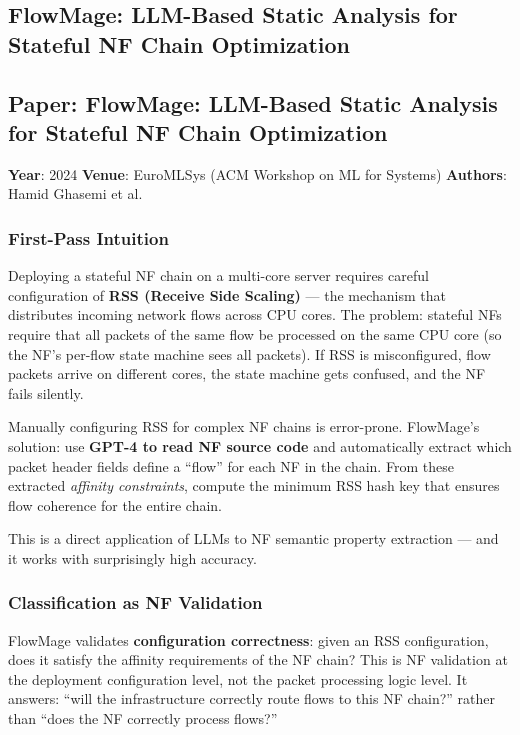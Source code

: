 \subsection{FlowMage: LLM-Based Static Analysis for Stateful NF Chain Optimization}

\subsection*{Paper: FlowMage: LLM-Based Static Analysis for Stateful NF Chain Optimization}
\textbf{Year}: 2024 \quad \textbf{Venue}: EuroMLSys (ACM Workshop on ML for Systems) \quad \textbf{Authors}: Hamid Ghasemi et al.

\subsubsection{First-Pass Intuition}

Deploying a stateful NF chain on a multi-core server requires careful configuration of \textbf{RSS (Receive Side Scaling)} --- the mechanism that distributes incoming network flows across CPU cores. The problem: stateful NFs require that all packets of the same flow be processed on the same CPU core (so the NF's per-flow state machine sees all packets). If RSS is misconfigured, flow packets arrive on different cores, the state machine gets confused, and the NF fails silently.

Manually configuring RSS for complex NF chains is error-prone. FlowMage's solution: use \textbf{GPT-4 to read NF source code} and automatically extract which packet header fields define a ``flow'' for each NF in the chain. From these extracted \emph{affinity constraints}, compute the minimum RSS hash key that ensures flow coherence for the entire chain.

This is a direct application of LLMs to NF semantic property extraction --- and it works with surprisingly high accuracy.

\subsubsection{Classification as NF Validation}

FlowMage validates \textbf{configuration correctness}: given an RSS configuration, does it satisfy the affinity requirements of the NF chain? This is NF validation at the deployment configuration level, not the packet processing logic level. It answers: ``will the infrastructure correctly route flows to this NF chain?'' rather than ``does the NF correctly process flows?''

